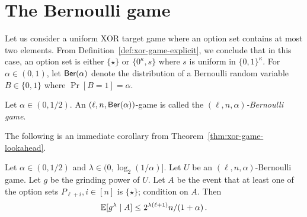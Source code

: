 \section{The Bernoulli game}\label{sec:bernoulli}

    Let us consider a uniform XOR target game where an option set 
    contains at most two elements. 
    From Definition~\ref{def:xor-game-explicit}, 
    we conclude that in this case, 
    an option set is either $\{\star\}$ 
    or $\{0^\kappa, s\}$ where $s$ is uniform in $\{0,1\}^\kappa$.
    For $\alpha \in (0,1)$, 
    let $\mathsf{Ber}(\alpha)$ denote the distribution of a Bernoulli random variable 
    $B \in \{0,1\}$ where $\Pr[B = 1] = \alpha$.


    \begin{definition}
        \label{def:static-game}\label{def:Bernoulli-game}
        Let $\alpha \in (0, 1/2)$. 
        An $(\ell, n, \mathsf{Ber}(\alpha))$-game 
        is called the \emph{$(\ell, n, \alpha)$-Bernoulli game}.
    \end{definition}
    The following is an immediate corollary from Theorem~\ref{thm:xor-game-lookahead}.

    \begin{theorem}\label{thm:xor-game-playornot}
        Let $\alpha \in (0, 1/2)$ and $\lambda \in (0, \log_2(1/\alpha)]$. 
        Let $U$ be an $(\ell, n, \alpha)$-Bernoulli game. 
        Let $g$ be the grinding power of $U$. 
        Let $A$ be the event that 
        at least one of the option sets $P_{\ell + i}, i \in [n]$ is $\{\star\}$; 
        condition on $A$. 
        Then 
        $$
            \operatorname{\mathbb{E}} [g^\lambda \mid A] \leq 2^{\lambda(\ell + 1)} n/(1+\alpha)
            \,.
        $$
    \end{theorem}

